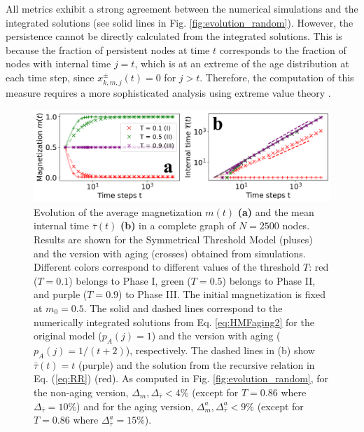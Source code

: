 All metrics exhibit a strong agreement between the numerical simulations and the integrated solutions (see solid lines in Fig. \ref{fig:evolution_random}). However, the persistence cannot be directly calculated from the integrated solutions. This is because the fraction of persistent nodes at time $t$ corresponds to the fraction of nodes with internal time $j = t$, which is at an extreme of the age distribution at each time step, since $x^{\pm}_{k,m,j}(t) = 0$ for $j > t$. Therefore, the computation of this measure requires a more sophisticated analysis using extreme value theory \cite{haan2006extreme}.

\begin{figure}
	\centering \captionsetup{font=sf}
	\includegraphics[width=\textwidth]{Figs/Aging_STM/FIG4.pdf}
	\caption[Aging effects in the complete graph]{\label{fig:COM_AGING} Evolution of the average magnetization $m(t)$ \textbf{(a)} and the mean internal time $\bar{\tau}(t)$ \textbf{(b)} in a complete graph of $N=2500$ nodes. Results are shown for the Symmetrical Threshold Model (pluses) and the version with aging (crosses) obtained from simulations. Different colors correspond to different values of the threshold $T$: red ($T = 0.1$) belongs to Phase I, green ($T = 0.5$) belongs to Phase II, and purple ($T = 0.9$) to Phase III. The initial magnetization is fixed at $m_0 = 0.5$. The solid and dashed lines correspond to the numerically integrated solutions from Eq. \ref{eq:HMFaging2} for the original model ($p_A(j) = 1$) and the version with aging ($p_A(j) = 1/(t+2)$), respectively. The dashed lines in (b) show $\bar{\tau}(t) = t$ (purple) and the solution from the recursive relation in Eq. (\ref{eq:RR}) (red). 
	As computed in Fig. \ref{fig:evolution_random}, for the non-aging version, $\Delta_{m}, \Delta_{\bar{\tau}}  < 4\%$ (except for $T = 0.86$ where $\Delta_{\bar{\tau}} = 10\%$) and for the aging version, $\Delta_{m}^{a}, \Delta^{a}_{\bar{\tau}} < 9\%$ (except for $T = 0.86$ where $\Delta^{a}_{\bar{\tau}} = 15\%$).}
\end{figure}

